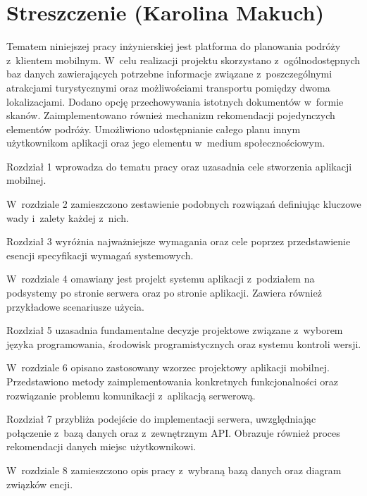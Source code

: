 \chapter*{Streszczenie (Karolina Makuch)}
 \par Tematem niniejszej pracy inżynierskiej jest platforma do planowania podróży z~klientem mobilnym. W~celu realizacji projektu skorzystano z~ogólnodostępnych baz danych zawierających potrzebne informacje związane z~poszczególnymi atrakcjami turystycznymi oraz możliwościami transportu pomiędzy dwoma lokalizacjami. Dodano opcję przechowywania istotnych dokumentów w~formie skanów. Zaimplementowano również mechanizm rekomendacji pojedynczych elementów podróży. Umożliwiono udostępnianie całego planu innym użytkownikom aplikacji oraz jego elementu w~medium społecznościowym.
 
 \par Rozdział 1 wprowadza do tematu pracy  oraz uzasadnia cele stworzenia aplikacji mobilnej. 
 
 \par W~rozdziale 2 zamieszczono zestawienie podobnych rozwiązań definiując kluczowe wady i~zalety każdej z~nich.

\par Rozdział 3 wyróżnia najważniejsze wymagania oraz cele poprzez przedstawienie esencji specyfikacji wymagań systemowych.

\par W~rozdziale 4 omawiany jest projekt systemu aplikacji z~podziałem na podsystemy po stronie serwera oraz po stronie aplikacji. Zawiera również przykładowe scenariusze użycia.

\par Rozdział 5 uzasadnia fundamentalne decyzje projektowe związane z~wyborem języka programowania, środowisk programistycznych oraz systemu kontroli wersji.

\par W~rozdziale 6 opisano zastosowany wzorzec projektowy aplikacji mobilnej. Przedstawiono metody zaimplementowania konkretnych funkcjonalności oraz rozwiązanie problemu komunikacji z~aplikacją serwerową. 

\par Rozdział 7 przybliża podejście do implementacji serwera, uwzględniając połączenie z~bazą danych oraz z~zewnętrznym API. Obrazuje również proces rekomendacji danych miejsc użytkownikowi.

\par W~rozdziale 8 zamieszczono opis pracy z~wybraną bazą danych oraz diagram związków encji.

